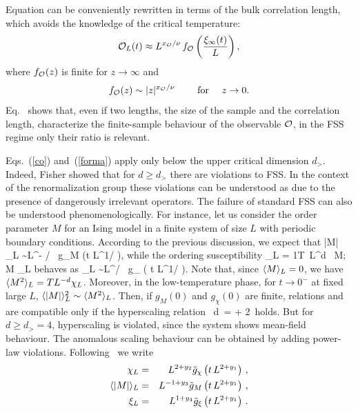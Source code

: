 \documentclass[12pt]{article}
\begin{document}
Equation  can be conveniently rewritten in terms 
of the bulk correlation
length,  which avoids the knowledge of the critical temperature:
\begin{equation}
  {\cal O}_L(t)  \approx L^{x_{\cal O} / \nu}\, f_{\cal O} \left({\xi_\infty(t) \over L}
   \right), \label{forma}
\end{equation}
where $ f_{\cal O}(z)$ is finite for $z\to\infty$ and 
\begin{equation}
   f_{\cal O}(z) \sim  |z|^{x_{\cal O}/\nu}  \qquad \hbox{ for }\quad z \to 0.
\end{equation}
Eq.~ shows that, even if two lengths,
the size of the sample and the correlation length,
characterize the finite-sample behaviour
of the observable ${\cal O}$, 
in the FSS regime only their ratio is relevant.

Eqs.~(\ref{co}) and~(\ref{forma}) apply only below the upper critical 
dimension $d_>$. 
Indeed, Fisher \cite{Fisher-Temple,Fisher-83,Privman-Fisher-83} 
showed that for $d \ge d_>$
there are violations to FSS. In the context of the renormalization
group these violations can be understood as due to the presence of
dangerously irrelevant operators.
The failure of standard FSS can also
be understood phenomenologically.
For instance, let us consider the order parameter
$M$ for an Ising model in a finite system of size $L$ with 
periodic boundary conditions. 
According to the previous discussion, we expect that 
\be
\< |M| \>_L \sim  L^{- {\beta / \nu}}\, g_M
  \left(t L^{1/\nu}
   \right), \label{gm}
\ee 
while the ordering susceptibility 
\be
 \chi_L = {1\over T}\, L^d \,  \< M; M \>_L \label{chiL}
\ee
behaves as
\be
 \chi_L  \sim  L^{\gamma / \nu}\, g_\chi
  \left( t L^{1/\nu}   \right).  \label{chi}
\ee
Note that, since $\langle M\rangle_L = 0$, we have $\langle M^2\rangle_L = T L^{-d}\chi_L$. 
Moreover, in the low-temperature phase, for $t\to0^-$ at fixed large $L$,
$\langle |M| \rangle_L^2\sim \langle M^2\rangle_L$. Then, if $g_M(0)$ and $g_\chi(0)$ are finite,
relations  and  are compatible only
if the hyperscaling relation~\cite{Fisher74}
\be
             d\, \nu = \gamma + 2\,\beta \label{hs}
\ee
holds. But for $d\ge d_>=4$, hyperscaling is violated, since 
the system shows mean-field behaviour.
The anomalous scaling behaviour can be obtained by adding power-law 
violations. Following~\cite{Young,Leung92} we write
\begin{eqnarray}
\chi_L &=& L^{2+y_2} \tilde{g}_\chi \left(t\,L^{2+y_1}\right) \, ,
\\
\langle|M|\rangle_L & = & L^{-1+y_3} \tilde{g}_{M} \left(t\,L^{2+y_1}\right)\, ,
\label{y3} \\
\xi_L &=& L^{1+y_4} \tilde{g}_\xi \left(t\,L^{2+y_1}\right)\, .
\label{y4}  
\end{eqnarray}
\end{document}
